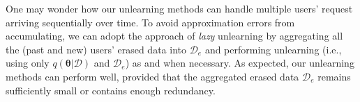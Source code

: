 \documentclass{article}
\theoremstyle{definition}
\newcommand{\mcl}[1]{\mathcal{#1}}
\newcommand{\da}{\mcl{D}}
\newcommand{\dr}{\mcl{D}_e}
\begin{document}
One may wonder how our unlearning methods can handle multiple users' request arriving sequentially over time.
To avoid approximation errors from accumulating, we can adopt the approach of \emph{lazy} unlearning by aggregating all the (past and new) users' erased data into $\dr$ and performing unlearning (i.e., using only $q(\bm{\theta}|\da)$ and $\dr$) as and when necessary. As expected, our unlearning methods can perform well, provided that the aggregated erased data $\dr$ remains sufficiently small or contains enough redundancy.
%
%
\end{document}
